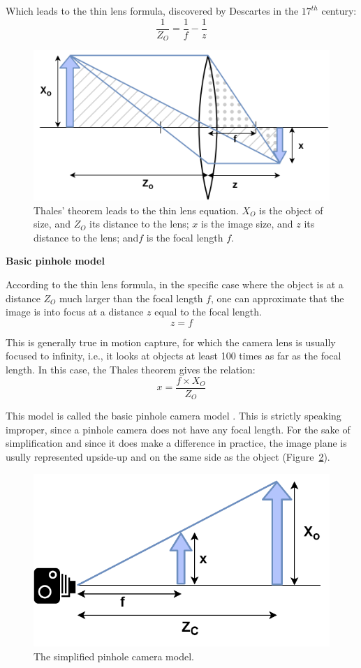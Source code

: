 Which leads to the thin lens formula, discovered by Descartes in the $17^{th}$ century:
\begin{equation}
    \frac{1}{Z_O} = \frac{1}{f} - \frac{1}{z}
\end{equation}

\begin{figure}[hbtp]
	\centering
	\def\svgwidth{\columnwidth}
	\fontsize{10pt}{10pt}\selectfont
	\includegraphics[width=0.5\linewidth]{"../Chap2/Figures/Thin_Lens.png"}
	\caption{Thales' theorem leads to the thin lens equation. \(X_O\) is the object of size, and \(Z_O\) its distance to the lens; \(x\) is the image size, and \(z\) its distance to the lens; and\(f\) is the focal length \(f\).} 
	\label{fig_thinlens}
\end{figure}

\noindent\textbf{Basic pinhole model}

According to the thin lens formula, in the specific case where the object is at a distance \(Z_O\) much larger than the focal length \(f\), one can approximate that the image is into focus at a distance \(z\) equal to the focal length. 
\begin{equation}
    z=f
\end{equation}

This is generally true in motion capture, for which the camera lens is usually focused to infinity, i.e., it looks at objects at least 100 times as far as the focal length. In this case, the Thales theorem gives the relation:
\begin{equation}
  x=\frac{f\times X_O}{Z_O}
\end{equation}

This model is called the basic pinhole camera model \cite{Zhang2000,Hartley2003,Tomasi2017}. This is strictly speaking improper, since a pinhole camera does not have any focal length. For the sake of simplification and since it does make a difference in practice, the image plane is usully represented upside-up and on the same side as the object (Figure~\ref{fig_cameralens}). 

\begin{figure}[hbtp]
	\centering
	\def\svgwidth{\columnwidth}
	\fontsize{10pt}{10pt}\selectfont
	\includegraphics[width=0.5\linewidth]{"../Chap2/Figures/Camera_Lens.png"}
	\caption{The simplified pinhole camera model.} 
	\label{fig_cameralens}
\end{figure}


